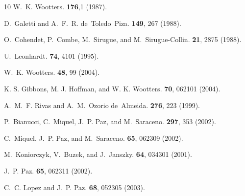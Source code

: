 \documentclass[aps,twocolumn,showpacs,nofootinbib,groupedaddress]{revtex4}
\begin{document}
\begin{thebibliography}{10}
W.~K. Wootters.
 \textbf{176},1 (1987).

D.~Galetti and A.~F.~R. de~Toledo~Piza.
 \textbf{149}, 267 (1988).

O.~Cohendet, P.~Combe, M.~Sirugue, and M.~Sirugue-Collin.
 \textbf{21}, 2875 (1988).

U.~Leonhardt.
 \textbf{74}, 4101 (1995).

W.~K. Wootters.
 \textbf{48}, 99 (2004).

K. S. Gibbons, M. J. Hoffman, and W. K. Wootters.
 \textbf{70}, 062101 (2004).

A.~M.~F. Rivas and A.~M.~Ozorio de~Almeida.
 \textbf{276}, 223 (1999).

P.~Bianucci, C.~Miquel, J.~P. Paz, and M.~Saraceno.
 \textbf{297}, 353 (2002).

C.~Miquel, J.~P. Paz, and M.~Saraceno.
 \textbf{65}, 062309 (2002).

M.~Koniorczyk, V.~Buzek, and J.~Janszky.
 \textbf{64}, 034301 (2001).

J.~P. Paz.
 \textbf{65}, 062311 (2002).

C.~C. Lopez and J.~P. Paz.
 \textbf{68}, 052305 (2003).


\end{thebibliography}
\end{document}
